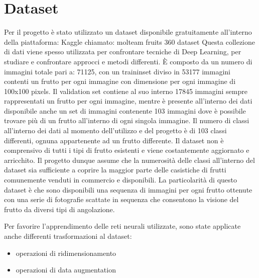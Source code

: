 \section{Dataset}
Per il progetto è stato utilizzato un dataset disponibile gratuitamente all'interno della piattaforma: Kaggle chiamato: molteam fruits 360 dataset \cite{dataset}
Questa collezione di dati viene spesso utilizzata per confrontare tecniche di Deep Learning, per studiare e confrontare approcci e metodi differenti.
È composto da un numero di immagini totale pari a: 71125, con un traininset diviso in 53177 immagini contenti un frutto per ogni immagine con dimensione per ogni immagine di 100x100 pixels.  
Il validation set contiene al suo interno 17845 immagini sempre rappresentati un frutto per ogni immagine, mentre è presente all'interno dei dati disponibile anche un set di immagini contenente 103 immagini dove è possibile trovare più di un frutto all'interno di ogni singola immagine.  
Il numero di classi all'interno dei dati al momento dell'utilizzo e del progetto è di 103 classi differenti, ognuna appartenente ad un frutto differente.  
Il dataset non è comprensivo di tutti i tipi di frutto esistenti e viene costantemente aggiornato e arricchito.
Il progetto dunque assume che la numerosità delle classi all'interno del dataset sia sufficiente a coprire la maggior parte delle casistiche di frutti comunemente venduti in commercio e disponibili.  
La particolarità di questo dataset è che sono disponibili una sequenza di immagini per ogni frutto ottenute con una serie di fotografie scattate in sequenza che consentono la visione del frutto da diversi tipi di angolazione.  
  
 Per favorire l'apprendimento delle reti neurali utilizzate, sono state applicate anche differenti trasformazioni al dataset:
 
\begin{itemize}
\item operazioni di ridimensionamento 
\item operazioni di data augmentation
\end{itemize}

